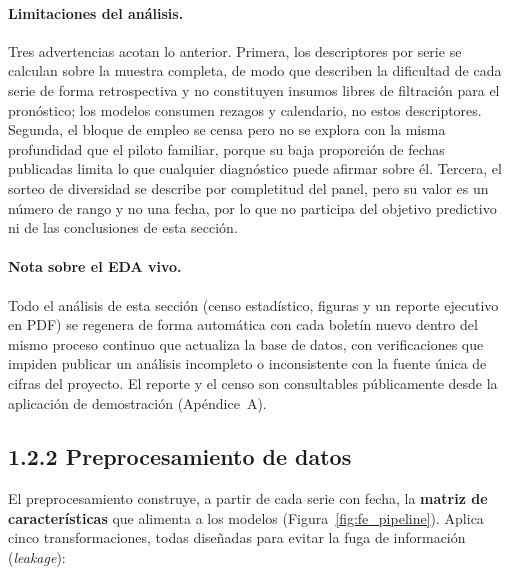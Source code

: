 \documentclass[12pt,letterpaper]{report}
\begin{document}
\paragraph{Limitaciones del análisis.} Tres advertencias acotan lo anterior. Primera, los
descriptores por serie se calculan sobre la muestra completa, de modo que describen la
dificultad de cada serie de forma retrospectiva y no constituyen insumos libres de filtración
para el pronóstico; los modelos consumen rezagos y calendario, no estos descriptores.
Segunda, el bloque de empleo se censa pero no se explora con la misma profundidad que el
piloto familiar, porque su baja proporción de fechas publicadas limita lo que cualquier
diagnóstico puede afirmar sobre él. Tercera, el sorteo de diversidad se describe por
completitud del panel, pero su valor es un número de rango y no una fecha, por lo que no
participa del objetivo predictivo ni de las conclusiones de esta sección.

\paragraph{Nota sobre el EDA vivo.} Todo el análisis de esta sección (censo
estadístico, figuras y un reporte ejecutivo en PDF) se regenera de forma automática
con cada boletín nuevo dentro del mismo proceso continuo que actualiza la base de
datos, con verificaciones que impiden publicar un análisis incompleto o inconsistente
con la fuente única de cifras del proyecto. El reporte y el censo son consultables
públicamente desde la aplicación de demostración (Apéndice~A).

\subsection{1.2.2 Preprocesamiento de datos}

El preprocesamiento construye, a partir de cada serie con fecha, la \textbf{matriz de
características} que alimenta a los modelos (Figura~\ref{fig:fe_pipeline}). Aplica cinco
transformaciones, todas diseñadas para evitar la fuga de información (\textit{leakage}):
\end{document}
